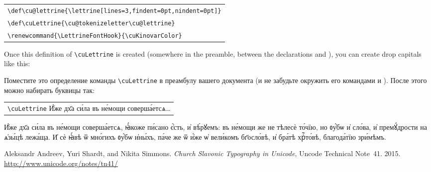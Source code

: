 \begin{center}
\begin{churchslavonic}
\begin{tabular}{l}
\verb+\def\cu@lettrine{\lettrine[lines=3,findent=0pt,nindent=0pt]}+\\
\verb+\def\cuLettrine{\cu@tokenizeletter\cu@lettrine}+\\
\verb+\renewcommand{\LettrineFontHook}{\cuKinovarColor}+\\
\end{tabular}
\end{churchslavonic}
\end{center}
%
\begin{EN}
Once this definition of \verb+\cuLettrine+ is created (somewhere in the preamble, between the declarations  and ),
you can create drop capitals like this:
\end{EN}
%
\begin{RU}
Поместите это определение команды \verb+\cuLettrine+ в преамбулу вашего документа (и не забудьте окружить его командами  и ).
После этого можно набирать буквицы так:
\end{RU}
%
\begin{center}
\begin{churchslavonic}
\begin{tabular}{l}
\verb+\cuLettrine+ И҆́же дх҃а си́ла въ не́мощи соверша́етсѧ\ldots\\
\end{tabular}
\end{churchslavonic}
\end{center}

\begin{churchslavonic}

\cuLettrine 
И҆́же дх҃а си́ла въ не́мощи соверша́етсѧ, ꙗ҆́коже пи́сано є҆́сть, и҆ вѣ́рꙋемъ: въ не́мощи же не тѣлесѐ то́чїю, но ᲂу҆́бѡ и҆ сло́ва, 
и҆ премꙋ́дрости на ѧ҆зы́цѣ лежа́ща. И҆ сѐ ꙗ҆́вѣ ѿ мно́гихъ ᲂу҆́бѡ и҆ны́хъ, па́че же ѿ и҆́же ѡ҆ вели́комъ бг҃осло́вѣ, и҆ бра́тѣ хрⷭ҇то́вѣ, 
благода́тїю зри́мѣмъ.

\end{churchslavonic}

\begin{thebibliography}{9}

  Aleksandr Andreev, Yuri Shardt, and Nikita Simmons.
  \emph{Church Slavonic Typography in Unicode},
  Uncode Technical Note~41. 2015.
  \url{http://www.unicode.org/notes/tn41/}

\end{thebibliography}


